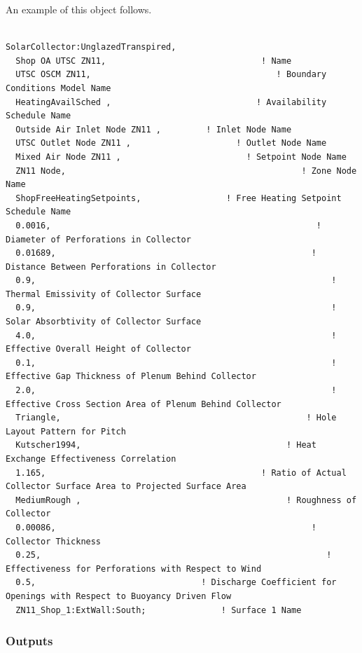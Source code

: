 An example of this object follows.

\begin{lstlisting}

SolarCollector:UnglazedTranspired,
  Shop OA UTSC ZN11,                               ! Name
  UTSC OSCM ZN11,                                     ! Boundary Conditions Model Name
  HeatingAvailSched ,                             ! Availability Schedule Name
  Outside Air Inlet Node ZN11 ,         ! Inlet Node Name
  UTSC Outlet Node ZN11 ,                     ! Outlet Node Name
  Mixed Air Node ZN11 ,                         ! Setpoint Node Name
  ZN11 Node,                                               ! Zone Node Name
  ShopFreeHeatingSetpoints,                 ! Free Heating Setpoint Schedule Name
  0.0016,                                                     ! Diameter of Perforations in Collector
  0.01689,                                                   ! Distance Between Perforations in Collector
  0.9,                                                           ! Thermal Emissivity of Collector Surface
  0.9,                                                           ! Solar Absorbtivity of Collector Surface
  4.0,                                                           ! Effective Overall Height of Collector
  0.1,                                                           ! Effective Gap Thickness of Plenum Behind Collector
  2.0,                                                           ! Effective Cross Section Area of Plenum Behind Collector
  Triangle,                                                 ! Hole Layout Pattern for Pitch
  Kutscher1994,                                         ! Heat Exchange Effectiveness Correlation
  1.165,                                           ! Ratio of Actual Collector Surface Area to Projected Surface Area
  MediumRough ,                                         ! Roughness of Collector
  0.00086,                                                   ! Collector Thickness
  0.25,                                                         ! Effectiveness for Perforations with Respect to Wind
  0.5,                                 ! Discharge Coefficient for Openings with Respect to Buoyancy Driven Flow
  ZN11_Shop_1:ExtWall:South;               ! Surface 1 Name
\end{lstlisting}

\subsubsection{Outputs}\label{outputs-4-015}


